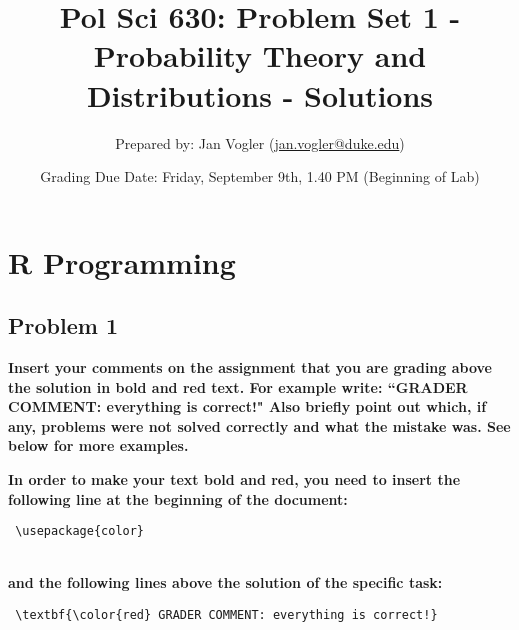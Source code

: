 \documentclass[12pt,letter]{article}\usepackage[]{graphicx}\usepackage[]{color}
\begin{document}
\title{Pol Sci 630: Problem Set 1 - Probability Theory and Distributions - Solutions}

\author{Prepared by: Jan Vogler (\href{mailto:jan.vogler@duke.edu}{jan.vogler@duke.edu})}

\date{Grading Due Date: Friday, September 9th, 1.40 PM (Beginning of Lab)}
 
\maketitle 



\section*{R Programming}

\subsection*{Problem 1}

\textbf{\color{red} Insert your comments on the assignment that you are grading above the solution in bold and red text. For example write: ``GRADER COMMENT: everything is correct!" Also briefly point out which, if any, problems were not solved correctly and what the mistake was. See below for more examples.}

\bigskip

\textbf{In order to make your text bold and red, you need to insert the following line at the beginning of the document:}

\begin{verbatim} \usepackage{color} \end{verbatim}

\\ \textbf{and the following lines above the solution of the specific task:}

\begin{verbatim} \textbf{\color{red} GRADER COMMENT: everything is correct!} \end{verbatim}
\end{document}
